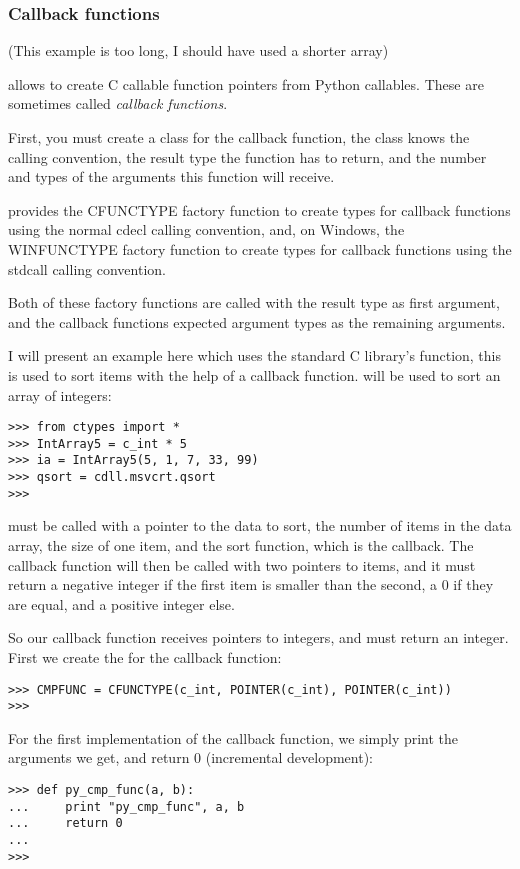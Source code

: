 \subsubsection{Callback functions\label{ctypes-callback-functions}}

(This example is too long, I should have used a shorter array)

 allows to create C callable function pointers from Python
callables. These are sometimes called \emph{callback functions}.

First, you must create a class for the callback function, the class
knows the calling convention, the result type the function has to
return, and the number and types of the arguments this function will
receive.

 provides the CFUNCTYPE factory function to create types for
callback functions using the normal cdecl calling convention, and, on
Windows, the WINFUNCTYPE factory function to create types for callback
functions using the stdcall calling convention.

Both of these factory functions are called with the result type as
first argument, and the callback functions expected argument types as
the remaining arguments.

I will present an example here which uses the standard C library's
 function, this is used to sort items with the help of a
callback function.  will be used to sort an array of
integers:
\begin{verbatim}
>>> from ctypes import *
>>> IntArray5 = c_int * 5
>>> ia = IntArray5(5, 1, 7, 33, 99)
>>> qsort = cdll.msvcrt.qsort
>>>
\end{verbatim}

 must be called with a pointer to the data to sort, the
number of items in the data array, the size of one item, and the sort
function, which is the callback. The callback function will then be
called with two pointers to items, and it must return a negative
integer if the first item is smaller than the second, a 0 if they are
equal, and a positive integer else.

So our callback function receives pointers to integers, and must
return an integer. First we create the  for the callback
function:
\begin{verbatim}
>>> CMPFUNC = CFUNCTYPE(c_int, POINTER(c_int), POINTER(c_int))
>>>
\end{verbatim}

For the first implementation of the callback function, we simply print
the arguments we get, and return 0 (incremental development):
\begin{verbatim}
>>> def py_cmp_func(a, b):
...     print "py_cmp_func", a, b
...     return 0
...
>>>
\end{verbatim}

